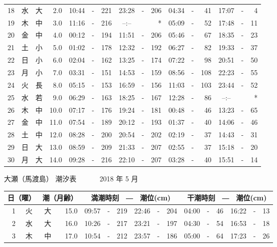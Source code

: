 \documentclass[12pt.a4j]{jsarticle}
\begin{document}
\begin{center}
\begin{table}[ht]
\begin{tabular}{|rc|cr|ccrccr|ccrccr|}
18 & 水 & 大 &  2.0 & 10:44 &-& 221 & 23:28 &-& 206 & 04:34 &-&  41 & 17:07 &-&   4 \\
19 & 木 & 中 &  3.0 & 11:16 &-& 216 & --:-- & &  *  & 05:09 &-&  52 & 17:48 &-&  11 \\
20 & 金 & 中 &  4.0 & 00:12 &-& 194 & 11:51 &-& 206 & 05:46 &-&  67 & 18:35 &-&  23 \\
21 & 土 & 小 &  5.0 & 01:02 &-& 178 & 12:32 &-& 192 & 06:27 &-&  82 & 19:33 &-&  37 \\
22 & 日 & 小 &  6.0 & 02:04 &-& 162 & 13:25 &-& 174 & 07:22 &-&  98 & 20:51 &-&  50 \\
23 & 月 & 小 &  7.0 & 03:31 &-& 151 & 14:53 &-& 159 & 08:56 &-& 108 & 22:23 &-&  55 \\
24 & 火 & 長 &  8.0 & 05:15 &-& 153 & 16:59 &-& 156 & 11:03 &-& 103 & 23:44 &-&  52 \\
25 & 水 & 若 &  9.0 & 06:29 &-& 163 & 18:25 &-& 167 & 12:28 &-&  86 & --:-- & &  *  \\
26 & 木 & 中 & 10.0 & 07:17 &-& 176 & 19:24 &-& 181 & 00:48 &-&  46 & 13:23 &-&  65 \\
27 & 金 & 中 & 11.0 & 07:54 &-& 189 & 20:12 &-& 193 & 01:37 &-&  40 & 14:06 &-&  46 \\
28 & 土 & 中 & 12.0 & 08:28 &-& 200 & 20:54 &-& 202 & 02:19 &-&  37 & 14:43 &-&  31 \\
29 & 日 & 大 & 13.0 & 08:59 &-& 209 & 21:33 &-& 207 & 02:55 &-&  37 & 15:18 &-&  20 \\
30 & 月 & 大 & 14.0 & 09:28 &-& 216 & 22:10 &-& 207 & 03:28 &-&  40 & 15:51 &-&  14 \\
\hline
\end{tabular}
\end{table}
\newpage
{\LARGE 大瀬（馬渡島）  潮汐表　　　}
{\large 2018 年  5 月}\\
\begin{table}[ht]
\begin{tabular}{|rc|cr|ccrccr|ccrccr|}
\hline
\multicolumn{2}{|c|}{日（曜）} & \multicolumn{2}{c|}{潮（月齢）} & \multicolumn{6}{c|}{満潮時刻　―　潮位(cm)} & \multicolumn{6}{c|}{干潮時刻　―　潮位(cm)} \\
\hline
 1 & 火 & 大 & 15.0 & 09:57 &-& 219 & 22:46 &-& 204 & 04:00 &-&  46 & 16:22 &-&  13 \\
 2 & 水 & 大 & 16.0 & 10:26 &-& 217 & 23:21 &-& 197 & 04:30 &-&  54 & 16:53 &-&  18 \\
 3 & 木 & 中 & 17.0 & 10:54 &-& 212 & 23:57 &-& 186 & 05:00 &-&  64 & 17:23 &-&  26 \\

\end{tabular}
\end{table}
\end{center}
\end{document}
